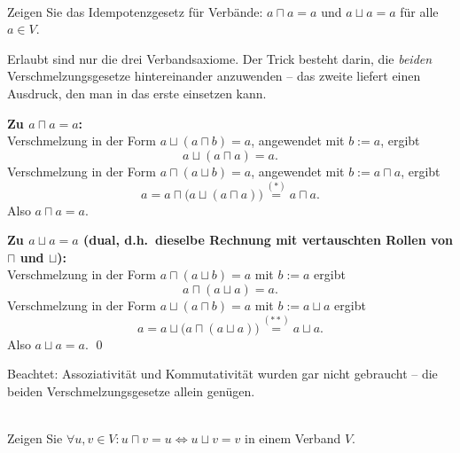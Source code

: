 \\
Zeigen Sie das Idempotenzgesetz für Verbände: $a \sqcap a = a$ und $a \sqcup a = a$ für alle $a \in V$.

\begin{loesung}
Erlaubt sind nur die drei Verbandsaxiome. Der Trick besteht darin, die \emph{beiden} Verschmelzungsgesetze hintereinander anzuwenden -- das zweite liefert einen Ausdruck, den man in das erste einsetzen kann.

\textbf{Zu $a\sqcap a=a$:}\\
Verschmelzung in der Form $a\sqcup(a\sqcap b)=a$, angewendet mit $b:=a$, ergibt
\begin{equation*}a\sqcup(a\sqcap a)=a. \tag{$*$}\end{equation*}
Verschmelzung in der Form $a\sqcap(a\sqcup b)=a$, angewendet mit $b:=a\sqcap a$, ergibt
\[a=a\sqcap\bigl(a\sqcup(a\sqcap a)\bigr)\overset{(*)}{=}a\sqcap a.\]
Also $a\sqcap a=a$.

\textbf{Zu $a\sqcup a=a$ (dual, d.h.\ dieselbe Rechnung mit vertauschten Rollen von $\sqcap$ und $\sqcup$):}\\
Verschmelzung in der Form $a\sqcap(a\sqcup b)=a$ mit $b:=a$ ergibt
\begin{equation*}a\sqcap(a\sqcup a)=a. \tag{$**$}\end{equation*}
Verschmelzung in der Form $a\sqcup(a\sqcap b)=a$ mit $b:=a\sqcup a$ ergibt
\[a=a\sqcup\bigl(a\sqcap(a\sqcup a)\bigr)\overset{(**)}{=}a\sqcup a.\]
Also $a\sqcup a=a$. \qed

Beachtet: Assoziativität und Kommutativität wurden gar nicht gebraucht -- die beiden Verschmelzungsgesetze allein genügen.
\end{loesung}

\\
Zeigen Sie $\forall u,v\in V: u\sqcap v = u \Leftrightarrow u\sqcup v = v$ in einem Verband $V$.


